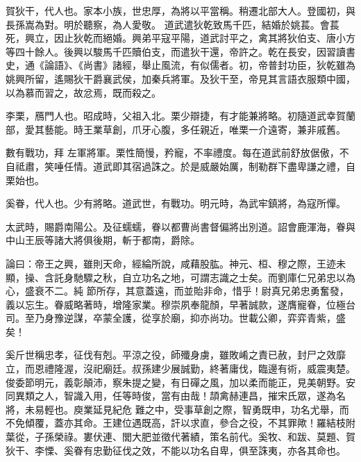 \begin{pinyinscope}
 賀狄干，代人也。家本小族，世忠厚，為將以平當稱。稍遷北部大人。登國初，與長孫嵩為對。明於聽察，為人愛敬。
 道武遣狄乾致馬千匹，結婚於姚萇。會萇死，興立，因止狄乾而絕婚。興弟平寇平陽，道武討平之，禽其將狄伯支、唐小方等四十餘人。後興以駿馬千匹贖伯支，而遣狄干還，帝許之。乾在長安，因習讀書史，通《論語》、《尚書》諸經，舉止風流，有似儒者。初，帝普封功臣，狄乾雖為姚興所留，遙賜狄干爵襄武侯，加秦兵將軍。及狄干至，帝見其言語衣服類中國，以為慕而習之，故忿焉，既而殺之。



 李栗，鴈門人也。昭成時，父祖入北。栗少辯捷，有才能兼將略。初隨道武幸賀蘭部，愛其藝能。時王業草創，爪牙心腹，多任親近，唯栗一介遠寄，兼非戚舊。



 數有戰功，拜
 左軍將軍。栗性簡慢，矜寵，不率禮度。每在道武前舒放倨傲，不自祗肅，笑唾任情。道武即其宿過誅之。於是威嚴始厲，制勒群下盡卑謙之禮，自栗始也。



 奚眷，代人也。少有將略。道武世，有戰功。明元時，為武牢鎮將，為寇所憚。



 太武時，賜爵南陽公。及征蠕蠕，眷以都曹尚書督偏將出別道。詔會鹿渾海，眷與中山王辰等諸大將俱後期，斬于都南，爵除。



 論曰：帝王之興，雖則天命，經綸所說，咸藉股肱。神元、桓、穆之際，王迹未顯，操、含託身馳驟之秋，自立功名之地，可謂志識之士矣。而劉庫仁兄弟忠以為心，盛衰不二。純
 節所存，其意蓋遠，而並貽非命，惜乎！尉真兄弟忠勇奮發，義以忘生。眷威略著時，增隆家業。穆崇夙奉龍顏，早著誠款，遂膺寵眷，位極台司。至乃身豫逆謀，卒蒙全護，從享於廟，抑亦尚功。世載公卿，弈弈青紫，盛矣！



 奚斤世稱忠孝，征伐有剋。平涼之役，師殲身虜，雖敗崤之責已赦，封尸之效靡立，而恩禮隆渥，沒祀廟廷。叔孫建少展誠勤，終著庸伐，臨邊有術，威震夷楚。俊委節明元，義彰顛沛，察朱提之變，有日磾之風，加以柔而能正，見美朝野。安同異類之人，智識入用，任等時俊，當有由哉！頡禽赫連昌，摧宋氏眾，遂為名將，未易輕也。庾業延見紀危
 難之中，受事草創之際，智勇既申，功名尤舉，而不免傾覆，蓋亦其命。王建位遇既高，訐以求直，參合之役，不其罪歟！羅結枝附葉從，子孫榮祿。婁伏連、閭大肥並徵代著績，策名前代。奚牧、和跋、莫題、賀狄干、李慄、奚眷有忠勤征伐之效，不能以功名自卑，俱至誅夷，亦各其命也。



\end{pinyinscope}